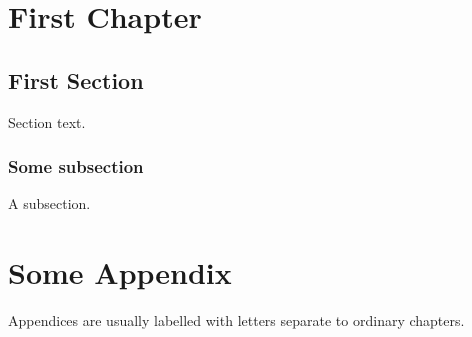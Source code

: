 \documentclass[10pt,oneside]{book}
\begin{document}
\setlength{\parskip}{10pt} 


\mainmatter



\chapter{First Chapter}
\section{First Section}

Section text.

\subsection{Some subsection}

A subsection.



\appendix
\chapter{Some Appendix}
Appendices are usually labelled with letters separate to ordinary chapters.


\singlespacing


\end{document}
